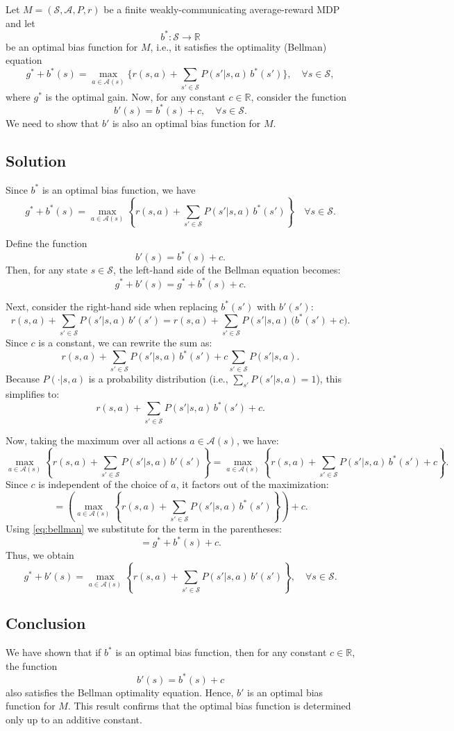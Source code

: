 Let $M=(\mathcal{S},\mathcal{A},P,r)$ be a finite weakly-communicating average-reward MDP and let 
\[
b^* : \mathcal{S} \to \mathbb{R}
\]
be an optimal bias function for $M$, i.e., it satisfies the optimality (Bellman) equation
\[
g^* + b^*(s) = \max_{a \in \mathcal{A}(s)} \Big\{ r(s,a) + \sum_{s'\in \mathcal{S}} P(s'|s,a) \, b^*(s') \Big\}, \quad \forall s\in\mathcal{S},
\]
where $g^*$ is the optimal gain. Now, for any constant $c \in \mathbb{R}$, consider the function 
\[
b'(s) = b^*(s) + c, \quad \forall s \in \mathcal{S}.
\]
We need to show that $b'$ is also an optimal bias function for $M$.

\subsection*{Solution}

Since $b^*$ is an optimal bias function, we have
\begin{equation}\label{eq:bellman}
g^* + b^*(s) = \max_{a \in \mathcal{A}(s)} \left\{ r(s,a) + \sum_{s'\in \mathcal{S}} P(s'|s,a) \, b^*(s') \right\} \quad \forall s \in \mathcal{S}.
\end{equation}

Define the function 
\[
b'(s) = b^*(s) + c.
\]
Then, for any state $s \in \mathcal{S}$, the left-hand side of the Bellman equation becomes:
\[
g^* + b'(s) = g^* + b^*(s) + c.
\]

Next, consider the right-hand side when replacing $b^*(s')$ with $b'(s')$:
\[
r(s,a) + \sum_{s'\in \mathcal{S}} P(s'|s,a) \, b'(s') 
= r(s,a) + \sum_{s'\in \mathcal{S}} P(s'|s,a) \, \bigl(b^*(s') + c\bigr).
\]
Since $c$ is a constant, we can rewrite the sum as:
\[
r(s,a) + \sum_{s'\in \mathcal{S}} P(s'|s,a) \, b^*(s') + c \sum_{s'\in \mathcal{S}} P(s'|s,a).
\]
Because $P(\cdot|s,a)$ is a probability distribution (i.e., $\sum_{s'} P(s'|s,a) = 1$), this simplifies to:
\[
r(s,a) + \sum_{s'\in \mathcal{S}} P(s'|s,a) \, b^*(s') + c.
\]

Now, taking the maximum over all actions $a\in\mathcal{A}(s)$, we have:
\[
\max_{a \in \mathcal{A}(s)} \left\{ r(s,a) + \sum_{s'\in \mathcal{S}} P(s'|s,a) \, b'(s') \right\} 
= \max_{a \in \mathcal{A}(s)} \left\{ r(s,a) + \sum_{s'\in \mathcal{S}} P(s'|s,a) \, b^*(s') + c \right\}.
\]
Since $c$ is independent of the choice of $a$, it factors out of the maximization:
\[
= \left( \max_{a \in \mathcal{A}(s)} \left\{ r(s,a) + \sum_{s'\in \mathcal{S}} P(s'|s,a) \, b^*(s') \right\} \right) + c.
\]
Using \eqref{eq:bellman} we substitute for the term in the parentheses:
\[
= g^* + b^*(s) + c.
\]
Thus, we obtain
\[
g^* + b'(s) = \max_{a \in \mathcal{A}(s)} \left\{ r(s,a) + \sum_{s'\in \mathcal{S}} P(s'|s,a) \, b'(s') \right\}, \quad \forall s \in \mathcal{S}.
\]

\subsection*{Conclusion}

We have shown that if $b^*$ is an optimal bias function, then for any constant $c\in\mathbb{R}$, the function 
\[
b'(s) = b^*(s) + c
\]
also satisfies the Bellman optimality equation. Hence, $b'$ is an optimal bias function for $M$. This result confirms that the optimal bias function is determined only up to an additive constant.